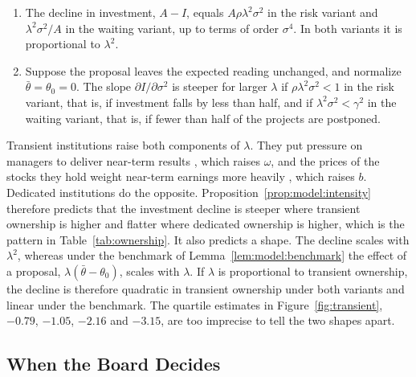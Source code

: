 \begin{proposition}\label{prop:model:intensity}
\leavevmode
\begin{enumerate}[label=(\roman*)]
  \item The decline in investment, $A-I$, equals $A\rho\lambda^{2}\sigma^{2}$ in the risk variant and $\lambda^{2}\sigma^{2}/A$ in the waiting variant, up to terms of order $\sigma^{4}$. In both variants it is proportional to $\lambda^{2}$.
  \item Suppose the proposal leaves the expected reading unchanged, and normalize $\bar\theta=\theta_0=0$. The slope $\partial I/\partial\sigma^{2}$ is steeper for larger $\lambda$ if $\rho\lambda^{2}\sigma^{2}<1$ in the risk variant, that is, if investment falls by less than half, and if $\lambda^{2}\sigma^{2}<\gamma^{2}$ in the waiting variant, that is, if fewer than half of the projects are postponed.
\end{enumerate}
\end{proposition}

Transient institutions raise both components of $\lambda$. They put pressure on managers to deliver near-term results \citep{bushee1998influence}, which raises $\omega$, and the prices of the stocks they hold weight near-term earnings more heavily \citep{bushee2001institutional}, which raises $b$. Dedicated institutions do the opposite. Proposition~\ref{prop:model:intensity} therefore predicts that the investment decline is steeper where transient ownership is higher and flatter where dedicated ownership is higher, which is the pattern in Table~\ref{tab:ownership}. It also predicts a shape. The decline scales with $\lambda^{2}$, whereas under the benchmark of Lemma~\ref{lem:model:benchmark} the effect of a proposal, $\lambda(\bar\theta-\theta_0)$, scales with $\lambda$. If $\lambda$ is proportional to transient ownership, the decline is therefore quadratic in transient ownership under both variants and linear under the benchmark. The quartile estimates in Figure~\ref{fig:transient}, $-0.79$, $-1.05$, $-2.16$ and $-3.15$, are too imprecise to tell the two shapes apart. %

\subsection{When the Board Decides}\label{sec:model:decision}


